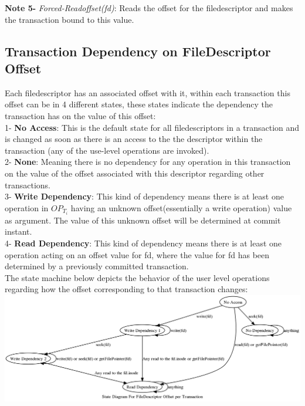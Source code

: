 \documentclass[a4paper, 11pt]{article}
\begin{document}
\textbf{Note 5-} \emph{Forced-Readoffset(fd)}: Reads the offset for the filedescriptor and makes the transaction bound to this value.\\

\subsection{Transaction Dependency on FileDescriptor Offset}

Each filedescriptor has an associated offset with it, within each transaction this offset can be in 4 different states, these states indicate the dependency the transaction has on the value of this offset:\\

1- \textbf{No Access}: This is the default state for all filedescriptors in a transaction and is changed as soon as there is an access to the the descriptor within the transaction (any of the use-level operations are invoked).\\

2- \textbf{None}: Meaning there is no dependency for any operation in this transaction on the value of the offset associated with this descriptor regarding other transactions.\\ %

3- \textbf{Write Dependency}: This kind of dependency means there is at least one operation in $OP_{T_i}$ having an unknown offset(essentially a write operation) value as argument. The value of this unknown offset will be determined at commit instant. \\

4- \textbf{Read Dependency}: This kind of dependency means there is at least one operation acting on an offset value for fd, where the value for fd has been determined by a previously committed transaction.\\


The state machine below depicts the behavior of the user level operations regarding how the offset corresponding to that transaction changes: \\

\includegraphics[scale = 0.3]{hello.png}\\
\end{document}
